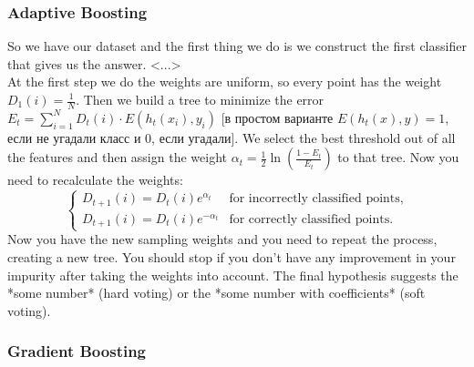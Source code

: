 \subsubsection*{Adaptive Boosting}

So we have our dataset and the first thing we do is we construct the first classifier that gives us the answer. <...>\\
At the first step we do the weights are uniform, so every point has the weight $D_1(i)=\frac{1}{N}$. Then we build a tree to minimize the error $E_t = \sum_{i=1}^N D_t(i) \cdot E(h_t(x_i), y_i)$ [в простом варианте $E(h_t(x),y) = 1$, если не угадали класс и $0$, если угадали]. We select the best threshold out of all the features and then assign the weight $\alpha_t=\frac{1}{2}\ln(\frac{1-E_t}{E_t})$ to that tree. {\it <A little description of this function and how it helps us>} Now you need to recalculate the weights:
$$\begin{cases}
D_{t+1}(i) = D_t(i)e^{\alpha_t}&\text{for incorrectly classified points,}\\
D_{t+1}(i)=D_t(i)e^{-\alpha_t}&\text{for correctly classified points.}
\end{cases}$$
Now you have the new sampling weights and you need to repeat the process, creating a new tree. You should stop if you don't have any improvement in your impurity after taking the weights into account. The final hypothesis suggests the *some number* (hard voting) or the *some number with coefficients* (soft voting).\\
{\it <A slide with an example>}

\subsubsection*{Gradient Boosting}


